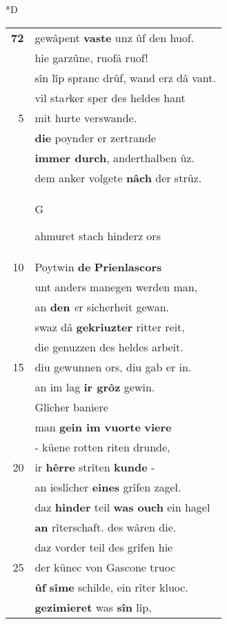 \documentclass[8pt,a4paper,notitlepage]{article}
\begin{document}
\begin{table}[ht]
\begin{minipage}[t]{0.5\linewidth}
\small
\begin{center}*D
\end{center}
\begin{tabular}{rl}
\textbf{72} & gewâpent \textbf{vaste} unz ûf den huof.\\ 
 & hie garzûne, ruofâ ruof!\\ 
 & sîn lîp spranc drûf, wand erz dâ vant.\\ 
 & vil sta\textit{r}ker sper des heldes hant\\ 
5 & mit hurte verswande.\\ 
 & \textbf{die} poynder er zertrande\\ 
 & \textbf{immer durch}, anderthalben ûz.\\ 
 & dem anker volgete \textbf{nâch} der strûz.\\ 
 & \begin{large}G\end{large}ahmuret stach hinderz ors\\ 
10 & Poytwin \textbf{de} \textbf{Prienlascors}\\ 
 & unt anders manegen werden man,\\ 
 & an \textbf{den} \textit{e}r sicherheit gewan.\\ 
 & swaz dâ \textbf{gekriuzter} ritter reit,\\ 
 & die genuzzen des heldes arbeit.\\ 
15 & diu gewunnen ors, diu gab er in.\\ 
 & an im lag \textbf{ir grôz} gewin.\\ 
 & Glîcher baniere\\ 
 & man \textbf{gein im vuorte} \textbf{viere}\\ 
 & - küene rotten riten drunde,\\ 
20 & ir \textbf{hêrre} strîten \textbf{kunde} -\\ 
 & an ieslîcher \textbf{eines} grîfen zagel.\\ 
 & daz \textbf{hinder} teil \textbf{was ouch} ein hagel\\ 
 & \textbf{an} rîterschaft. des wâren die.\\ 
 & daz vorder teil des grîfen hie\\ 
25 & der künec von Gascone truoc\\ 
 & \textbf{ûf} \textbf{sîme} schilde, ein rîter kluoc.\\ 
 & \textbf{gezimieret} was \textbf{sîn} lîp,\\ 

\end{tabular}
\end{minipage}
\end{table}
\end{document}
